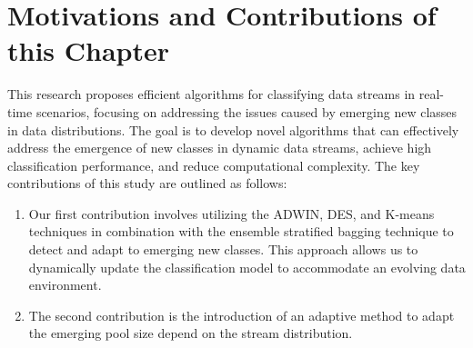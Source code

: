   \section{Motivations and Contributions of this Chapter} \label{sec:5_2_motivation}
  This research proposes efficient algorithms for classifying data streams in real-time scenarios, focusing on addressing the issues caused by emerging new classes in data distributions. The goal is to develop novel algorithms that can effectively address the emergence of new classes in dynamic data streams, achieve high classification performance, and reduce computational complexity. The key contributions of this study are outlined as follows:
  \begin{enumerate}[nosep]
    \item Our first contribution involves utilizing the ADWIN, DES, and K-means techniques in combination with the ensemble stratified bagging technique to detect and adapt to emerging new classes. This approach allows us to dynamically update the classification model to accommodate an evolving data environment.
   \item The second contribution is the introduction of an adaptive method to adapt the emerging pool size depend on the stream distribution.
    \end{enumerate} 
   
     
  
  
 
   

